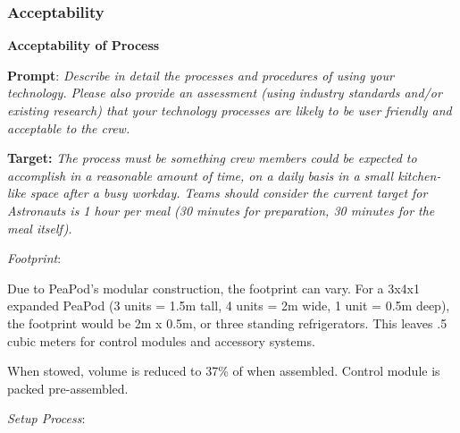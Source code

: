 \documentclass{report}
\begin{document}
\subsubsection{Acceptability}
\label{sec:acceptability}

\textbf{Acceptability of Process}
\label{sec:acceptability-process}

\textbf{Prompt}: \textit{Describe in detail the processes and procedures of using your technology. Please also provide an assessment (using industry standards and/or existing research) that your technology processes are likely to be user friendly and acceptable to the crew.}

\textbf{Target:} \textit{The process must be something crew members could be expected to accomplish in a reasonable amount of time, on a daily basis in a small kitchen-like space after a busy workday. Teams should consider the current target for Astronauts is 1 hour per meal (30 minutes for preparation, 30 minutes for the meal itself).}


\textit{Footprint}:

Due to PeaPod's modular construction, the footprint can vary. For a 3x4x1 expanded PeaPod (3 units = 1.5m tall, 4 units = 2m wide, 1 unit = 0.5m deep), the footprint would be 2m x 0.5m, or three standing refrigerators. This leaves .5 cubic meters for control modules and accessory systems. 

When stowed, volume is reduced to 37\% of when assembled. Control module is packed pre-assembled.

\newpage

\textit{Setup Process}:
\end{document}
